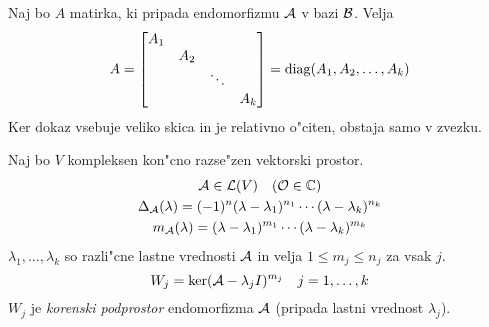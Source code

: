 Naj bo $A$ matirka, ki pripada endomorfizmu $\mathcal{A}$ v bazi $\mathcal{B}$. Velja
\begin{equation*}
A = \begin{bmatrix}
A_1 & & & \\
& A_2 & & \\
& & \ddots & \\
& & & A_k
\end{bmatrix} = \operatorname{diag}(A_1, A_2, \ldots, A_k)
\end{equation*}
Ker dokaz vsebuje veliko skica in je relativno o"citen, obstaja samo v zvezku.

Naj bo $V$ kompleksen kon"cno razse"zen vektorski prostor.
\begin{gather*}
\mathcal{A} \in \mathcal{L}(V) \quad (\mathcal{O} \in \mathbb{C}) \\
\Delta_{\mathcal{A}} (\lambda) = (-1)^n (\lambda - \lambda_1)^{n_1} \cdots (\lambda - \lambda_k)^{n_k} \\
m_{\mathcal{A}} (\lambda) = (\lambda - \lambda_1)^{m_1} \cdots (\lambda - \lambda_k)^{m_k}
\end{gather*}
$\lambda_1, \ldots, \lambda_k$ so razli"cne lastne vrednosti $\mathcal{A}$ in velja $1 \leq m_j \leq n_j$ za vsak $j$.
\begin{equation*}
W_j = \ker(\mathcal{A} - \lambda_j I)^{m_j} \quad j = 1, \ldots, k
\end{equation*}
$W_j$ je \emph{korenski podprostor} endomorfizma $\mathcal{A}$ (pripada lastni vrednost $\lambda_j$).

